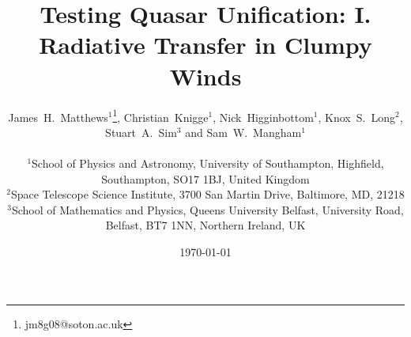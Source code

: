 \documentclass[useAMS,usenatbib]{mn2e_x}
\begin{document}


\def\py{\textsc{Python}}
\def\tar{\textsc{Tardis}}
\def\cld{\textsc{Cloudy}}
\def\agn{\textsc{Agnspec}}


\def\civ{C~\textsc{iv}}
\def\nv{N~\textsc{v}}
\def\hei{He~\textsc{i}}
\def\heii{He~\textsc{ii}}
\def\heiiline{He~\textsc{ii}~$4686$\AA}
\def\mg{Mg~\textsc{ii}}
\def\al{Al~\textsc{iii}}
\def\heii{He~\textsc{ii}}
\def\ovi{O~\textsc{vi}}
\def\la{Ly~$\alpha$}
\def\ha{H~$\alpha$}
\def\hb{H~$\beta$}



\def\araa{ARAA}
\def\nat{Nature}
\def\apjl{ApJ Letters}
\def\aapr{AAPR}
\def\ssr{SSR}
\def\apj{ApJ}
\def\apjs{ApJs}
\def\pasp{PASP}
\def\aap{A\&A}
\def\mnras{MNRAS}
\def\aj{AJ}
\def\rmxaa{RMXAA}
\def\aaps{A\&As}
\def\LA{Lyman\thinspace$\alpha$}

\newcommand{\EXPN}[2]{\mbox{$#1\times 10^{#2}$}}
\newcommand{\EXPU}[3]{\mbox{\rm $#1 \times 10^{#2} \rm\:#3$}}  %
\newcommand{\POW}[2]{\mbox{$\rm10^{#1}\rm\:#2$}}
\def\LUM{\:{\rm erg\:s^{-1}}}
\def\FLUX{\:{\rm erg\:cm^{-2}\:s^{-1}}}
\def\OIGS{\:{\rm erg\:cm^{-2}\:s^{-1}\:\AA^{-1}}}

%
%

\title
{
Testing Quasar Unification: I. Radiative Transfer in Clumpy Winds
}


\author[Matthews et al.]{
\parbox[t]{\textwidth}{
James~H.~Matthews$^1$\thanks{jm8g08@soton.ac.uk}, Christian~Knigge$^1$,
Nick~Higginbottom$^1$, Knox~S.~Long$^2$, Stuart~A.~Sim$^3$ and Sam~W.~Mangham$^1$
}
\medskip  
\\$^1$School of Physics and Astronomy, University of Southampton, Highfield, Southampton, SO17 1BJ, United Kingdom
\\$^2$Space Telescope Science Institute, 3700 San Martin Drive, Baltimore, MD, 21218
\\$^3$School of Mathematics and Physics, Queens University Belfast, University Road, Belfast, BT7 1NN, Northern Ireland, UK
}





\date{\today}
\end{document}
